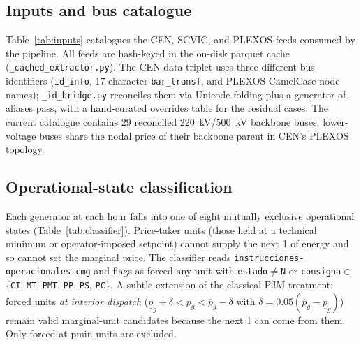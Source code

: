 \subsection{Inputs and bus catalogue}
\label{sec:inputs}

Table~\ref{tab:inputs} catalogues the CEN, SCVIC, and PLEXOS feeds
consumed by the pipeline.  All feeds are hash-keyed in the on-disk
parquet cache (\texttt{\_cached\_extractor.py}).  The CEN data
triplet uses three different bus identifiers (\texttt{id\_info},
17-character \texttt{bar\_transf}, and PLEXOS CamelCase node names);
\texttt{\_id\_bridge.py} reconciles them via Unicode-folding plus a
generator-of-aliases pass, with a hand-curated overrides table for
the residual cases.  The current catalogue contains \num{29}
reconciled \SI{220}{\kV}/\SI{500}{\kV} backbone buses; lower-voltage
buses share the nodal price of their backbone parent in CEN's PLEXOS
topology.

\begin{table}[t]
  \centering
  \caption{Public-data inventory consumed by \texttt{cen2gtopt}.
  Every feed is hash-keyed in the on-disk parquet cache; ``settled''
  is post-closeout, ``intra-day'' is the PID re-clear, ``day-ahead''
  is the PCP forecast.}
  \label{tab:inputs}
  
\end{table}

\subsection{Operational-state classification}
\label{sec:classifier}

Each generator at each hour falls into one of eight mutually
exclusive operational states (Table~\ref{tab:classifier}).
Price-taker units (those held at a technical minimum or
operator-imposed setpoint) cannot supply the next \SI{1}{\MWh} of
energy and so cannot set the marginal price.  The classifier reads
\texttt{instrucciones-operacionales-cmg} and flags as forced any
unit with \texttt{estado}$\ne$\texttt{N} or
\texttt{consigna}$\in$\{\texttt{CI}, \texttt{MT}, \texttt{PMT},
\texttt{PP}, \texttt{PS}, \texttt{PC}\}.  A subtle extension of the
classical PJM treatment: forced units \emph{at interior dispatch}
($\underline{p}_g+\delta<p_g<\overline{p}_g-\delta$ with
$\delta=0.05(\overline{p}_g-\underline{p}_g)$) remain valid
marginal-unit candidates because the next \SI{1}{\MWh} can come from
them.  Only forced-at-pmin units are excluded.

\begin{table}[t]
  \centering
  \caption{Operational-state classification.  Priority is evaluated
  top-down: the first matching row determines the unit's status.}
  \label{tab:classifier}
  
\end{table}

